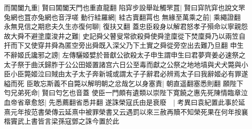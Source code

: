 而閶闔九重|{
	賢曰閶闔天門也重直龍翻}
陷穽步設舉趾觸罘罝|{
	賢曰穽阬穽也說文罘兔網也罝亦兔網也音浮嗟}
動行絓羅網|{
	絓古賣翻罥也}
無緣至萬乘之前|{
	乘繩證翻}
永無見信之期悲夫久生亦復何聊|{
	復扶又翻}
蓋忠臣殺身以解君怒孝子殞命以寧親怨故大舜不避塗廩浚井之難|{
	史記舜父瞽叟常欲殺舜使舜塗廩從下焚廩舜乃以兩笠自扞而下又使穿井舜為匿空旁出舜既入深父乃下土實之舜從旁空出去難乃旦翻}
申生不辭姬氏讒邪之謗|{
	左傳驪姬嬖於晉獻公欲殺太子申生謂申生曰君夢齊姜必速祭之太子祭于曲沃歸胙于公公田姬置諸宫六日公至毒而獻之公祭之地地墳與犬犬斃與小臣小臣斃姬泣曰賊由太子太子奔新城或謂太子子辭君必辨焉太子曰我辭姬必有罪遂縊而死}
臣敢忘斯義不自斃以解明朝之忿哉乞以身塞責|{
	朝直遥翻塞悉則翻}
願陛下匄兄弟死命|{
	賢曰匄乞也音蓋}
使臣一門頗有遺類以崇陛下寛饒之惠先死陳情臨章泣血帝省章愈怒|{
	先悉薦翻省悉井翻}
遂誅榮寇氏由是衰廢　|{
	考異曰袁紀置此事於延熹元年按范書榮傳云延熹中被罪榮書又云遇罰以來三赦再贖不知榮死果在何年按襄楷竇武上書皆言梁孫寇鄧之誅今置於此}


